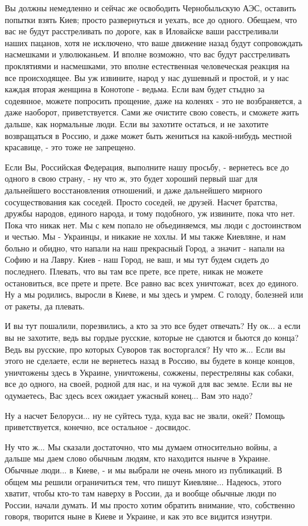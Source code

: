 Вы должны немедленно и сейчас же освободить Чернобыльскую АЭС, оставить попытки взять Киев; просто
развернуться и уехать, все до одного. Обещаем, что вас не будут расстреливать
по дороге, как в Иловайске ваши расстреливали наших пацанов, хотя не исключено,
что ваше движение назад будут сопровождать насмешками и улюлюканьем. И вполне
возможно, что вас будут расстреливать проклятиями и насмешками, это вполне
естественная человеческая реакция на все происходящее. Вы уж извините, народ у
нас душевный и простой, и у нас каждая вторая женщина в Конотопе - ведьма. Если
вам будет стыдно за содеянное, можете попросить прощение, даже на коленях - это
не возбраняется, а даже наоборот, приветствуется. Сами же очистите свою
совесть, и сможете жить дальше, как нормальные люди. Если вы захотите остаться,
и не захотите возвращаться в Россию, и даже может быть жениться на какой-нибудь
местной красавице, - это тоже не запрещено.

Если Вы, Российская Федерация, выполните нашу просьбу, - вернетесь все до
одного в свою страну, - ну что ж, это будет хороший первый шаг для дальнейшего
восстановления отношений, и даже дальнейшего мирного сосуществования как
соседей. Просто соседей, не друзей. Насчет братства, дружбы народов, единого
народа, и тому подобного, уж извините, пока что нет.  Пока что никак нет. Мы с
кем попало не объединяемся, мы люди с достоинством и честью. Мы - Украинцы, и
никакие не хохлы. И мы также Киевляне, и нам больно и обидно, что напали на наш
прекрасный Город, а значит - напали на Софию и на Лавру. Киев - наш Город, не
ваш, и мы тут будем сидеть до последнего.  Плевать, что вы там все прете, все
прете, никак не можете остановиться, все прете и прете. Все равно вас всех
уничтожат, всех до единого. Ну а мы родились, выросли в Киеве, и мы здесь и
умрем. С голоду, болезней или от ракеты, да плевать.

И вы тут пошалили, порезвились, а кто за это все будет отвечать? Ну ок... а
если вы не захотите, ведь вы гордые русские, которые не сдаются и бьются до
конца? Ведь вы русские, про которых Суворов так восторгался? Ну что ж...  Если
вы этого не сделаете, если не вернетесь назад в Россию, вы будете в конце
концов, уничтожены здесь в Украине, уничтожены, сожжены, перестреляны как
собаки, все до одного, на своей, родной для нас, и на чужой для вас земле.
Если вы не одумаетесь, Вас здесь всех ожидает ужасный конец... Вам это надо?

Ну а насчет Белоруси... ну не суйтесь туда, куда вас не звали, окей? Помощь
приветствуется, конечно, все остальное - досвидос.

Ну что ж... Мы сказали достаточно, что мы думаем относительно войны, а дальше
мы даем слово обычным людям, кто находится нынче в Украине. Обычные люди... в
Киеве, - и мы выбрали не очень много из публикаций. В общем мы решили
ограничиться тем, что пишут Киевляне... Надеюсь, этого хватит, чтобы кто-то там
наверху в России, да и вообще обычные люди по России, начали думать. И мы
просто хотим обратить внимание, что, собственно говоря, творится ныне в Киеве и
Украине, и как это все видится изнутри.
